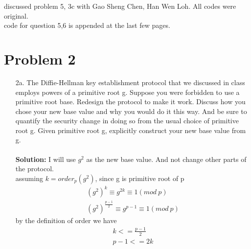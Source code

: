 \documentclass[12pt,letterpaper]{article}
\begin{document}
    discussed problem 5, 3c with Gao Sheng Chen, Han Wen Loh. All codes were original. \\
    code for question 5,6 is appended at the last few pages.
\section*{Problem 2}
\begin{enumerate}
  \item[2a.]
    The Diffie-Hellman key establishment protocol that we discussed in class employs powers of a primitive root g. Suppose you were forbidden to use a primitive root base.  Redesign the protocol to make it work.  Discuss how you chose your new base value and why you would do it this way. And be sure to quantify the security change in doing so from the usual choice of primitive root g.  Given primitive root g, explicitly construct your new base value from g.\\ \\
    \textbf{Solution:} I will use $g^2$ as the new base value.  And not change other parts of the protocol. \\
    assuming $k = order_p(g^2)$, since g is primitive root of p
    \begin{align}
      (g^2) ^ k \equiv g^{2k}  \equiv 1(mod \ p) \\
      (g^2)^\frac{p-1}{2} \equiv g^{p-1} \equiv 1(mod \ p)
    \end{align}
    by the definition of order we have
    \begin{align*}
      k <= \frac{p-1}{2} \\
      p-1 <= 2k
    \end{align*}


\end{enumerate}
\end{document}
